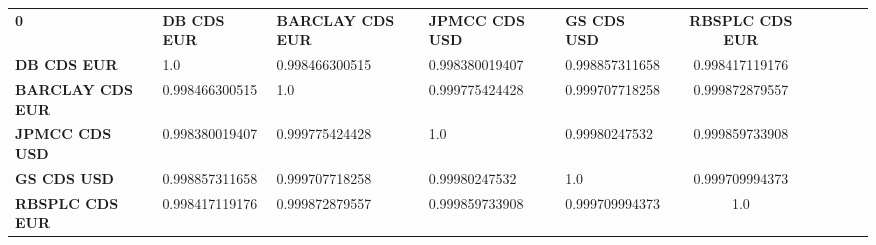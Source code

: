 \begin{center}
 \begin{tabular}{|l|l|l|l|l|c|c|c|c|c|}
\hline
\textbf{0} & \textbf{DB CDS EUR} & \textbf{BARCLAY CDS EUR} & \textbf{JPMCC CDS USD} & \textbf{GS CDS USD} & \textbf{RBSPLC CDS EUR}\\\hhline{|=|=|=|=|=|=|}
\textbf{DB CDS EUR} & 1.0 & 0.998466300515 & 0.998380019407 & 0.998857311658 & 0.998417119176\\
\textbf{BARCLAY CDS EUR} & 0.998466300515 & 1.0 & 0.999775424428 & 0.999707718258 & 0.999872879557\\
\textbf{JPMCC CDS USD} & 0.998380019407 & 0.999775424428 & 1.0 & 0.99980247532 & 0.999859733908\\
\textbf{GS CDS USD} & 0.998857311658 & 0.999707718258 & 0.99980247532 & 1.0 & 0.999709994373\\
\textbf{RBSPLC CDS EUR} & 0.998417119176 & 0.999872879557 & 0.999859733908 & 0.999709994373 & 1.0\\
\hline
\end{tabular}
\end{center}